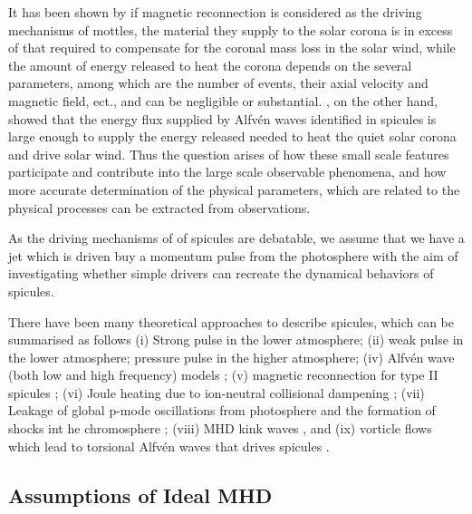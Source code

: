 \documentclass[12pt]{ociamthesis}
\newcommand{\Alfven}{Alfv\'{e}n }
\begin{document}
\par It has been shown by \cite{Tsiropoula2004} if magnetic reconnection is considered as the driving mechanisms of mottles, the material they supply to the solar corona is in excess of that required to compensate for the coronal mass loss in the solar wind, while the amount of energy released to heat the corona depends on the several parameters, among which are the number of events, their axial velocity and magnetic field, ect., and can be negligible or substantial. \cite{De_Pontieu2007ApJ}, on the other hand, showed that the energy flux supplied by \Alfven waves identified in spicules is large enough to supply the energy released needed to heat the quiet solar corona and drive solar wind. Thus the question arises of how these small scale features participate and contribute into the large scale observable phenomena, and how more accurate determination of the physical parameters, which are related to the physical processes can be extracted from observations.
\par As the driving mechanisms of of spicules are debatable, we assume that we have a jet which is driven buy a momentum pulse from the photosphere with the aim of investigating whether simple drivers can recreate the dynamical behaviors of spicules.
\par There have been many theoretical approaches to describe spicules, which can be summarised as follows (i) Strong pulse in the lower atmosphere; (ii) weak pulse in the lower atmosphere; pressure pulse in the higher atmosphere; (iv) \Alfven wave (both low and high frequency) models \cite{Zaqarashvili_2009SSRv}; (v) magnetic reconnection for type II spicules \cite{Pontieu2007PASJ, Sterling2010ApJ}; (vi) Joule heating due to ion-neutral collisional dampening \cite{James2003AA}; (vii) Leakage of global p-mode oscillations from photosphere and the formation of shocks int he chromosphere \cite{Pontieu2004Natur,Zaqarashvili2007A&A}; (viii) MHD kink waves \citep{Kukhianidze2006A&A}, and (ix) vorticle flows which lead to torsional \Alfven waves that drives spicules \citep{Iijima2017ApJ}.
\subsection{Assumptions of Ideal MHD}
\label{subsec:assumpt}

\end{document}
